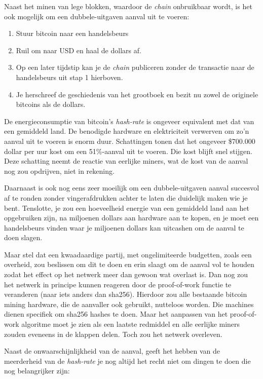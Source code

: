 \documentclass[
  letterpaper,
]{scrbook}
\begin{document}
Naast het minen van lege blokken, waardoor de \emph{chain} onbruikbaar
wordt, is het ook mogelijk om een dubbele-uitgaven aanval uit te voeren:

\begin{enumerate}
\def\labelenumi{\arabic{enumi}.}
\item
  Stuur bitcoin naar een handelsbeurs
\item
  Ruil om naar USD en haal de dollars af.
\item
  Op een later tijdstip kan je de \emph{chain} publiceren zonder de
  transactie naar de handelsbeurs uit stap 1 hierboven.
\item
  Je herschreef de geschiedenis van het grootboek en bezit nu zowel de
  originele bitcoins als de dollars.
\end{enumerate}

De energieconsumptie van bitcoin's \emph{hash-rate} is ongeveer
equivalent met dat van een gemiddeld land. De benodigde hardware en
elektriciteit verwerven om zo'n aanval uit te voeren is enorm duur.
Schattingen tonen dat het ongeveer \$700.000 dollar per uur kost om een
51\%-aanval uit te voeren. Die kost blijft snel stijgen. Deze schatting
neemt de reactie van eerlijke miners, wat de kost van de aanval nog zou
opdrijven, niet in rekening.

Daarnaast is ook nog eens zeer moeilijk om een dubbele-uitgaven aanval
succesvol af te ronden zonder vingerafdrukken achter te laten die
duidelijk maken wie je bent. Tenslotte, je zou een hoeveelheid energie
van een gemiddeld land aan het opgebruiken zijn, na miljoenen dollars
aan hardware aan te kopen, en je moet een handelsbeurs vinden waar je
miljoenen dollars kan uitcashen om de aanval te doen slagen.

Maar stel dat een kwaadaardige partij, met ongelimiteerde budgetten,
zoals een overheid, zou beslissen om dit te doen en erin slaagt om de
aanval vol te houden zodat het effect op het netwerk meer dan gewoon wat
overlast is. Dan nog zou het netwerk in principe kunnen reageren door de
proof-of-work functie te veranderen (naar iets anders dan sha256).
Hierdoor zou alle bestaande bitcoin mining hardware, die de aanvaller
ook gebruikt, nutteloos worden. Die machines dienen specifiek om sha256
hashes te doen. Maar het aanpassen van het proof-of-work algoritme moet
je zien als een laatste redmiddel en alle eerlijke miners zouden
eveneens in de klappen delen. Toch zou het netwerk overleven.

Naast de onwaarschijnlijkheid van de aanval, geeft het hebben van de
meerderheid van de \emph{hash-rate} je nog altijd het recht niet om
dingen te doen die nog belangrijker zijn:
\end{document}
